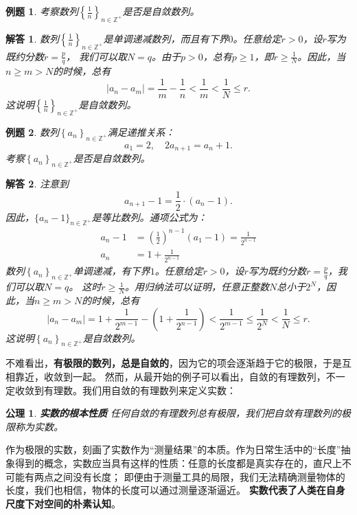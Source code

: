 \documentclass[12pt,UTF8]{ctexbook}
\newtheorem{et}{例题}[section]
\newtheorem*{po}{公理}
\newtheorem*{so}{解答}
\begin{document}
\begin{et} 
    考察数列$\left\{\frac{1}{n}\right\}_{n\in\mathbb{Z}^+}$是否是自敛数列。\\
\end{et}
\begin{so}
    数列$\left\{\frac{1}{n}\right\}_{n\in\mathbb{Z}^+}$是单调递减数列，而且有下界$0$。任意给定$r>0$，设$r$写为既约分数$r = \frac{p}{q}$，
    我们可以取$N = q$。由于$p > 0$，总有$p \geqslant 1$，即$r \geqslant \frac{1}{N}$。因此，当$n\geqslant m>N$的时候，总有
    $$|a_n - a_m| = \frac{1}{m} - \frac{1}{n} < \frac{1}{m} < \frac{1}{N} \leqslant r.$$
    这说明$\left\{\frac{1}{n}\right\}_{n\in\mathbb{Z}^+}$是自敛数列。
\end{so}
\begin{et} 
    数列$\left\{a_n\right\}_{n\in\mathbb{Z}^+}$满足递推关系：
    $$a_1 = 2, \quad 2a_{n+1} = a_n + 1.$$
    \indent 考察$\left\{a_n\right\}_{n\in\mathbb{Z}^+}$是否是自敛数列。\\
\end{et}
\begin{so}
    注意到
    $$ a_{n+1} - 1 = \frac{1}{2}\cdot (a_n - 1). $$
    因此，$\{a_n - 1\}_{n\in\mathbb{Z}^+}$是等比数列。通项公式为：
    \begin{align*}
        a_n - 1 &= \left(\frac12\right)^{n-1} (a_1 - 1) = \frac{1}{2^{n-1}}  \\
        a_n &= 1 + \frac{1}{2^{n-1}} 
    \end{align*}
    数列$\left\{a_n\right\}_{n\in\mathbb{Z}^+}$单调递减，有下界$1$。任意给定$r>0$，设$r$写为既约分数$r = \frac{p}{q}$，我们可以取$N = q$。
    这时$r \geqslant \frac{1}{N}$。用归纳法可以证明，任意正整数$N$总小于$2^N$，因此，当$n\geqslant m>N$的时候，总有
    $$|a_n - a_m| = 1 + \frac{1}{2^{m-1}} - \left(1 + \frac{1}{2^{n-1}} \right) < \frac{1}{2^{m-1}} \leqslant \frac{1}{2^N} < \frac{1}{N} \leqslant r.$$
    这说明$\left\{a_n\right\}_{n\in\mathbb{Z}^+}$是自敛数列。
\end{so}

不难看出，\textbf{有极限的数列，总是自敛的}，因为它的项会逐渐趋于它的极限，于是互相靠近，收敛到一起。
然而，从最开始的例子可以看出，自敛的有理数列，不一定收敛到有理数。我们用自敛的有理数列来定义实数：
\begin{po}\textbf{实数的根本性质}
    任何自敛的有理数列总有极限，我们把自敛有理数列的极限称为实数。
\end{po}

作为极限的实数，刻画了实数作为“测量结果”的本质。作为日常生活中的“长度”抽象得到的概念，实数应当具有这样的性质：任意的长度都是真实存在的，直尺上不可能有两点之间没有长度；
即便由于测量工具的局限，我们无法精确测量物体的长度，我们也相信，物体的长度可以通过测量逐渐逼近。
\textbf{实数代表了人类在自身尺度下对空间的朴素认知}。
\end{document}

